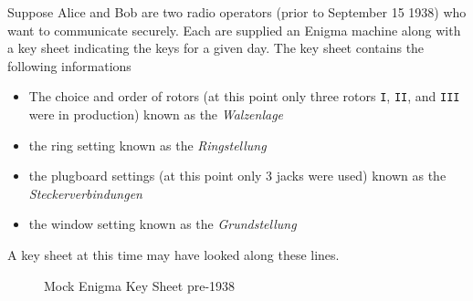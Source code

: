 Suppose Alice and Bob are two radio operators (prior to September 15
1938) who want to communicate securely. Each are supplied an Enigma
machine along with a key sheet indicating the keys for a given day.
The key sheet contains the following informations
\begin{itemize}
  \item The choice and order of rotors (at this point only three
      rotors \texttt{I}, \texttt{II}, and \texttt{III} were in
    production) known as the \emph{Walzenlage}
  \item the ring setting known as the \emph{Ringstellung}
  \item the plugboard settings (at this point only 3 jacks were used)
    known as the \emph{Steckerverbindungen}
  \item the window setting known as the \emph{Grundstellung}
\end{itemize}
A key sheet at this time may have looked along these lines.

\begin{figure}[h]
  \begin{center}
  \end{center}
  \caption{Mock Enigma Key Sheet pre-1938}
  \label{fig:keysheet_early}
\end{figure}

